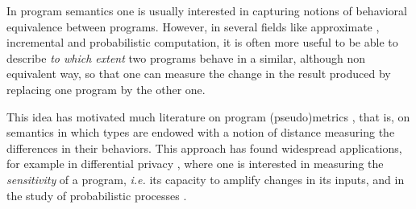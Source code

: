 
In program semantics one is usually interested in capturing notions of behavioral equivalence between programs. However,  
in several fields like approximate \cite{Mittal2016}, incremental \cite{Cai2014, Picallo2019} and probabilistic \cite{10.1109/LICS.2015.64} computation, it is often more useful to be able to describe \emph{to which extent}  two programs behave in a similar, although non equivalent way, so that one can measure the change in the result produced by
replacing one program by the other one.



This idea has motivated much literature on program (pseudo)metrics \cite{ARNOLD1980181, VANBREUGEL20011,Azevedo_de_Amorim_2017, Escardo1999, BAIER1994171,10.1109/LICS.2015.64, 10.1007/978-3-662-44584-6_4, 10.1007/978-3-662-54434-1_13, 10.1145/3209108.3209149}, that is, on semantics in which types are endowed with a notion of distance measuring the differences in their behaviors. This approach has found widespread applications, for example in differential privacy \cite{10.1145/1932681.1863568, 10.1007/978-3-642-29420-4_3, Barthe_2012}, where one is interested in measuring the \emph{sensitivity} of a program, \textit{i.e.} its capacity to amplify changes in its inputs, and in the study of probabilistic processes \cite{DESHARNAIS2004323, VANBREUGEL2005115, 10.1007/978-3-662-44584-6_4,10.1007/3-540-48224-5_35}.
%

 
 
 
% 
% 
    
